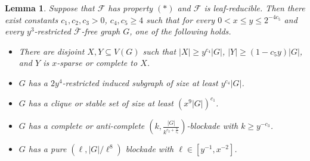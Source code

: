 \documentclass[a4paper,11pt]{article}
\newtheorem{lemma}[theorem]{Lemma}
\begin{document}
    \begin{lemma}\label{lem:main-pure-blockade}
        Suppose that $\mathcal{F}$ has property $(*)$ and $\mathcal{F}$ is leaf-reducible. Then
        there exist constants $c_1,c_2,c_3>0$, $c_4,c_5\geq 4$ such that for every $0<x\leq y\leq 2^{-4c_5}$ and every $y^3$-restricted $\overline{\mathcal{F}}$-free graph $G$, one of the following holds.
        \begin{itemize}
        
            \item[$(1)$] There are disjoint $X,Y\subseteq V(G)$ such that $|X|\geq y^{c_4}|G|$, $|Y|\geq (1-c_5y)|G|$, and $Y$ is $x$-sparse or complete to $X$.
            
            \item[$(2)$] $G$ has a $2y^4$-restricted induced subgraph of size at least $y^{c_4}|G|$.
            
            \item[$(3)$] $G$ has a clique or stable set of size at least $(x^{9}|G|)^{c_1}$. 
            
            \item[$(4)$] $G$ has a complete or anti-complete $(k,\frac{|G|}{k^{c_2+\frac{6}{c_3}}})$-blockade with $k\geq y^{-c_3}$.
            
            \item[$(5)$] $G$ has a pure $(\ell,|G|/\ell^{8})$ blockade with $\ell\in[y^{-1}, x^{-2}]$.
            
        \end{itemize}
    \end{lemma}
    
\end{document}
